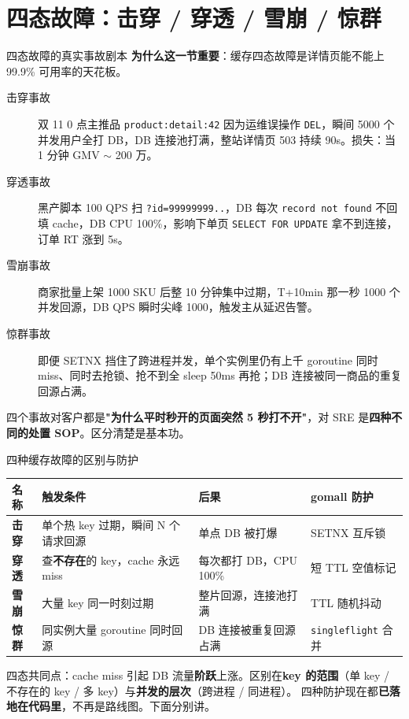 \documentclass[aspectratio=169,11pt]{beamer}
\begin{document}
\section{四态故障：击穿 / 穿透 / 雪崩 / 惊群}

\begin{frame}[shrink]{四态故障的真实事故剧本}
\textbf{为什么这一节重要}：缓存四态故障是详情页能不能上 99.9\% 可用率的天花板。
\vspace{1mm}
\begin{description}
  \item[击穿事故] 双 11 0 点主推品 \texttt{product:detail:42} 因为运维误操作 \texttt{DEL}，瞬间 5000 个并发用户全打 DB，DB 连接池打满，整站详情页 503 持续 90s。损失：当 1 分钟 GMV $\sim$ 200 万。
  \item[穿透事故] 黑产脚本 100 QPS 扫 \texttt{?id=99999999..}，DB 每次 \texttt{record not found} 不回填 cache，DB CPU 100\%，影响下单页 \texttt{SELECT FOR UPDATE} 拿不到连接，订单 RT 涨到 5s。
  \item[雪崩事故] 商家批量上架 1000 SKU 后整 10 分钟集中过期，T+10min 那一秒 1000 个并发回源，DB QPS 瞬时尖峰 1000，触发主从延迟告警。
  \item[惊群事故] 即便 SETNX 挡住了跨进程并发，单个实例里仍有上千 goroutine 同时 miss、同时去抢锁、抢不到全 sleep 50ms 再抢；DB 连接被同一商品的重复回源占满。
\end{description}
\vspace{1mm}
\small 四个事故对客户都是\textbf{"为什么平时秒开的页面突然 5 秒打不开"}，对 SRE 是\textbf{四种不同的处置 SOP}。区分清楚是基本功。
\end{frame}

\begin{frame}[shrink]{四种缓存故障的区别与防护}
\footnotesize
\begin{tabular}{@{}llll@{}}
\toprule
名称 & 触发条件 & 后果 & gomall 防护 \\
\midrule
\textbf{击穿} & 单个热 key 过期，瞬间 N 个请求回源 & 单点 DB 被打爆 & SETNX 互斥锁 \\
\textbf{穿透} & 查\textbf{不存在}的 key，cache 永远 miss & 每次都打 DB，CPU 100\% & 短 TTL 空值标记 \\
\textbf{雪崩} & 大量 key 同一时刻过期 & 整片回源，连接池打满 & TTL 随机抖动 \\
\textbf{惊群} & 同实例大量 goroutine 同时回源 & DB 连接被重复回源占满 & \texttt{singleflight} 合并 \\
\bottomrule
\end{tabular}
\vspace{2mm}
\small 四态共同点：cache miss 引起 DB 流量\textbf{阶跃}上涨。区别在\textbf{key 的范围}（单 key / 不存在的 key / 多 key）与\textbf{并发的层次}（跨进程 / 同进程）。
四种防护现在都\textbf{已落地在代码里}，不再是路线图。下面分别讲。
\end{frame}
\end{document}
